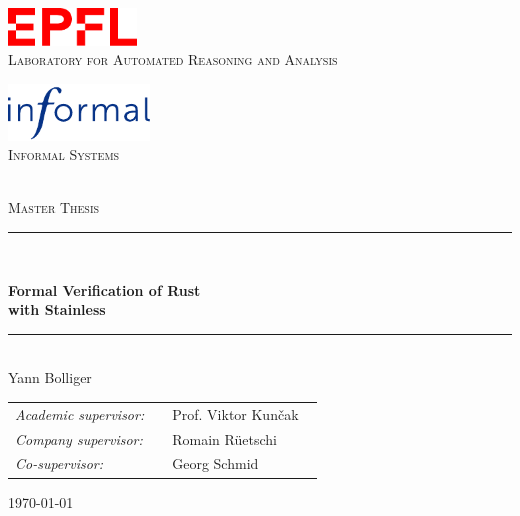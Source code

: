 \thispagestyle{empty}
\begin{center}

\vspace{4cm}
\begin{minipage}[b]{.4\textwidth}
  \begin{center}
    \includegraphics[height=10mm]{img/epfl-logo.pdf}\\
    \vspace*{3mm}
    \textsc{Laboratory for Automated Reasoning and Analysis}
  \end{center}
\end{minipage}
\begin{minipage}[b]{.4\textwidth}
  \begin{center}
    \includegraphics[height=15mm]{img/informal-logo.pdf}\\
    \textsc{Informal Systems}\\~
  \end{center}
\end{minipage}

\vspace{4cm}
{\Large \textsc{Master Thesis}}
\vspace*{1cm}

\rule{.9\linewidth}{.6pt}\\[0.4cm]
{\huge \bfseries Formal Verification of Rust \\ with Stainless \par}\vspace{0.4cm}
\rule{.9\linewidth}{.6pt}\\[1.5cm]

\vspace*{1cm}
{\Large Yann Bolliger}
\vspace*{1cm}

\begin{tabular}{ll}
\textit{Academic supervisor:} & ~~Prof. Viktor Kun\v{c}ak \\
\textit{Company supervisor:}  & ~~Romain Rüetschi ~~~~ \\
\textit{Co-supervisor:}       & ~~Georg Schmid
\end{tabular}

\vspace*{3cm}
\today\\[4cm] %

\end{center}
\clearpage


